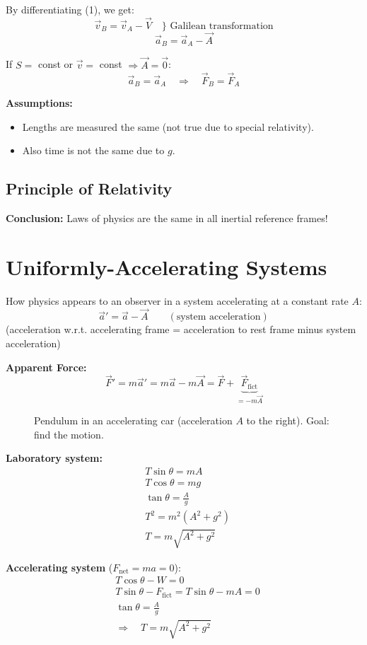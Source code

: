 By differentiating (1), we get:
\[
  \vec{v}_B = \vec{v}_A - \vec{V} \quad \Bigg\} \text{ Galilean transformation}
\]
\[
  \vec{a}_B = \vec{a}_A - \vec{A}
\]

If $S = $ const or $\vec{v} = $ const $\Rightarrow \vec{A} = \vec{0}$:
\[
  \vec{a}_B = \vec{a}_A \quad \Rightarrow \quad \vec{F}_B = \vec{F}_A
\]

\textbf{Assumptions:}
\begin{itemize}
  \item Lengths are measured the same (not true due to special relativity).
  \item Also time is not the same due to $g$.
\end{itemize}

\subsection{Principle of Relativity}

\textbf{Conclusion:} Laws of physics are the same in all inertial reference frames!

\section{Uniformly-Accelerating Systems}

How physics appears to an observer in a system accelerating at a constant rate $A$:
\[
  \vec{a}' = \vec{a} - \vec{A} \qquad (\text{system acceleration})
\]
(acceleration w.r.t. accelerating frame = acceleration to rest frame minus system acceleration)

\textbf{Apparent Force:}
\[
  \vec{F}' = m\vec{a}' = m\vec{a} - m\vec{A} = \vec{F} + \underbrace{\vec{F}_\text{fict}}_{= -m\vec{A}}
\]

\begin{example}

\begin{figure}[H]
  \centering
  \caption{Pendulum in an accelerating car (acceleration $A$ to the right). Goal: find the motion.}
\end{figure}

\textbf{Laboratory system:}
\begin{align*}
  &T\sin\theta = mA \\
  &T\cos\theta = mg \\
  &\tan\theta = \frac{A}{g} \\
  &T^2 = m^2(A^2+g^2) \\
  &T = m\sqrt{A^2+g^2}
\end{align*}

\textbf{Accelerating system} ($F_\text{net} = ma = 0$):
\begin{align*}
  &T\cos\theta - W = 0 \\
  &T\sin\theta - F_\text{fict} = T\sin\theta - mA = 0 \\
  &\tan\theta = \frac{A}{g} \\
  &\Rightarrow \quad T = m\sqrt{A^2+g^2}
\end{align*}
\end{example}

